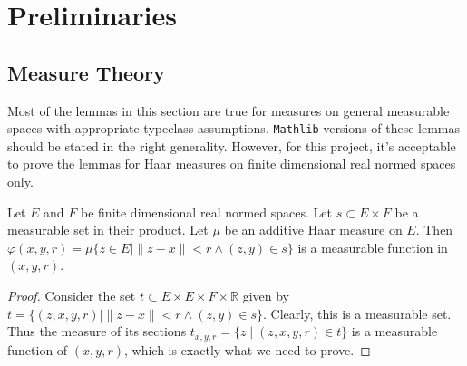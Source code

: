 %

\chapter{Preliminaries}%
\label{cha:preliminaries}

\section{Measure Theory}%
\label{sec:measure-theory}

Most of the lemmas in this section
are true for measures on general measurable spaces
with appropriate typeclass assumptions.
\texttt{Mathlib} versions of these lemmas should be stated
in the right generality.
However, for this project, it's acceptable to prove the lemmas
for Haar measures on finite dimensional real normed spaces only.

\begin{lemma}%
  \label{lem:measurable-meas-ball}
  \leanok%
  Let \(E\) and \(F\) be finite dimensional real normed spaces.
  Let \(s \subset E \times F\) be a measurable set in their product.
  Let \(\mu\) be an additive Haar measure on \(E\).
  Then \(\varphi(x, y, r) = \mu \{z \in E\mid \|z - x\| < r \wedge (z, y) \in s\}\)
  is a measurable function in \((x, y, r)\).
\end{lemma}
\begin{proof}
  \leanok%
  Consider the set \(t \subset E \times E \times F \times \mathbb R\)
  given by \(t = \{(z, x, y, r) \mid \|z - x\| < r \wedge (z, y) \in s\}\).
  Clearly, this is a measurable set.
  Thus the measure of its sections \(t_{x, y, r}=\{z \mid (z, x, y, r) \in t\}\)
  is a measurable function of \((x, y, r)\),
  which is exactly what we need to prove.
\end{proof}

